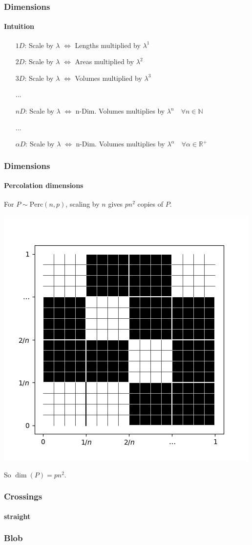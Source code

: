 \documentclass{beamer}
\newcommand{\perc}[2]{\text{Perc}\left( #1, #2 \right)}
\newcommand{\N}{\mathbb{N}}
\newcommand{\R}{\mathbb{R}}
\begin{document}
	\begin{frame}
		\frametitle{Dimensions}
		\framesubtitle{Intuition}
		\begin{itemize}
			\pause
			\item[$1D$:] Scale by $\lambda$ $\iff$ Lengths multiplied by $\lambda^1$
			\pause
			\item[$2D$:] Scale by $\lambda$ $\iff$ Areas multiplied by $\lambda^2$
			\pause
			\item[$3D$:] Scale by $\lambda$ $\iff$ Volumes multiplied by $\lambda^3$
			\pause
			\item[$\dots$]
			\item[$nD$:] Scale by $\lambda$ $\iff$ n-Dim. Volumes multiplies by $\lambda^n \quad \forall n \in \N$
			\pause
			\item[\color{purple} $\dots$]
			\item[\color{red} $\alpha D$:] \color{brickred} Scale by $\lambda$ $\iff$ n-Dim. Volumes multiplies by $\lambda^{\alpha} \quad \forall \alpha \in \R^+$
		\end{itemize}
	\end{frame}
	\begin{frame}
		\frametitle{Dimensions}
		\framesubtitle{Percolation dimensions}
		For $P \sim \perc{n}{p}$, scaling by $n$ gives $pn^2$ copies of $P$.
		\begin{center}
			\includegraphics[scale=0.4]{imgs/perc_fig2.png}
		\end{center}
		So $\dim(P) = pn^2$.
		
	\end{frame}
	
	
	
	\begin{frame}
	    \frametitle{Crossings}
		\framesubtitle{straight}
	\end{frame}
	
	
	\begin{frame}
	    \frametitle{Blob}
	\end{frame}
	
\end{document}
